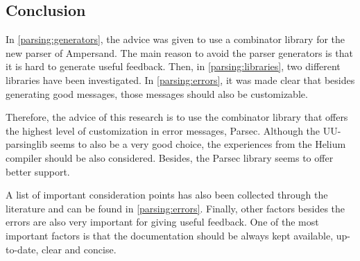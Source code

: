 
\subsection{Conclusion}
\label{parsing:conclusion}
In \autoref{parsing:generators}, the advice was given to use a combinator library for the new parser of Ampersand.
The main reason to avoid the parser generators is that it is hard to generate useful feedback.
Then, in \autoref{parsing:libraries}, two different libraries have been investigated.
In \autoref{parsing:errors}, it was made clear that besides generating good messages, those messages should also be customizable.

Therefore, the advice of this research is to use the combinator library that offers the highest level of customization in error messages, Parsec.
Although the UU-parsinglib seems to also be a very good choice, the experiences from the Helium compiler  should be also considered.
Besides, the Parsec library seems to offer better support.

A list of important consideration points has also been collected through the literature and can be found in \autoref{parsing:errors}.
Finally, other factors besides the errors are also very important for giving useful feedback.
One of the most important factors is that the documentation should be always kept available, up-to-date, clear and concise.
